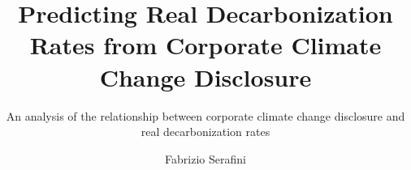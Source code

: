 \title{Predicting Real Decarbonization Rates from Corporate Climate Change Disclosure}
\subtitle{An analysis of the relationship between corporate climate change disclosure and real decarbonization rates}
\author{Fabrizio Serafini}


